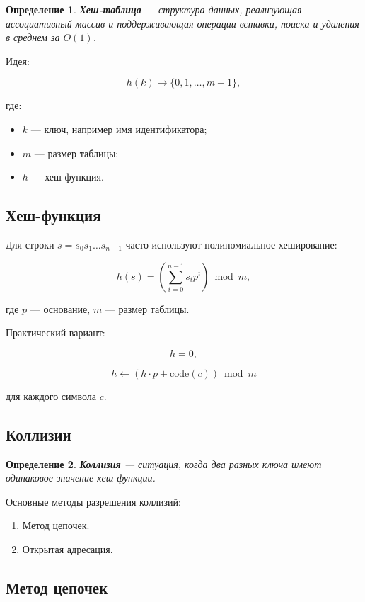 \documentclass[12pt,a4paper]{article}
\newtheorem{definition}{Определение}
\begin{document}
\begin{definition}
\textbf{Хеш-таблица} --- структура данных, реализующая ассоциативный массив и поддерживающая операции вставки, поиска и удаления в среднем за $O(1)$.
\end{definition}

Идея:

\[
h(k) \to \{0,1,\ldots,m-1\},
\]

где:
\begin{itemize}
    \item $k$ --- ключ, например имя идентификатора;
    \item $m$ --- размер таблицы;
    \item $h$ --- хеш-функция.
\end{itemize}

\subsection{Хеш-функция}

Для строки $s=s_0s_1\ldots s_{n-1}$ часто используют полиномиальное хеширование:

\[
h(s)
=
\left(
\sum_{i=0}^{n-1}
s_i p^i
\right)
\bmod m,
\]

где $p$ --- основание, $m$ --- размер таблицы.

Практический вариант:

\[
h = 0,
\]

\[
h \gets (h \cdot p + \mathrm{code}(c)) \bmod m
\]

для каждого символа $c$.

\subsection{Коллизии}

\begin{definition}
\textbf{Коллизия} --- ситуация, когда два разных ключа имеют одинаковое значение хеш-функции.
\end{definition}

Основные методы разрешения коллизий:

\begin{enumerate}
    \item Метод цепочек.
    \item Открытая адресация.
\end{enumerate}

\subsection{Метод цепочек}
\end{document}
